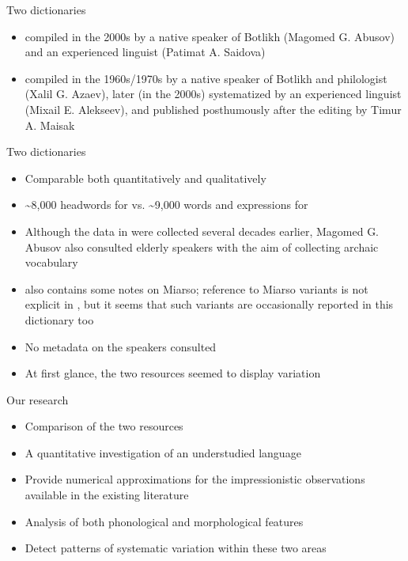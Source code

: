 \begin{frame}{Two dictionaries}
\begin{itemize}
    \item \citet{saidovaabusov2012} compiled in the 2000s by a native speaker of Botlikh (Magomed G. Abusov) and an experienced linguist (Patimat A. Saidova)
    \item \citet{alekseev2019} compiled in the 1960s/1970s by a native speaker of Botlikh and philologist (Xalil G. Azaev), later (in the 2000s) systematized by an experienced linguist (Mixail E. Alekseev), and published posthumously after the editing by Timur A. Maisak
\end{itemize}
\end{frame}

\begin{frame}{Two dictionaries}
\begin{itemize}
    \item Comparable both quantitatively and qualitatively
    \item \textasciitilde{}8,000 headwords for \citet{saidovaabusov2012} vs. \textasciitilde{}9,000 words and expressions for \citet{alekseev2019}
    \item Although the data in \citet{alekseev2019} were collected several decades earlier, Magomed G. Abusov also consulted elderly speakers with the aim of collecting archaic vocabulary 
    \item \citet{saidovaabusov2012} also contains some notes on Miarso; reference to Miarso variants is not explicit in \citet{alekseev2019}, but it seems that such variants are occasionally reported in this dictionary too
    \item No metadata on the speakers consulted
    \item At first glance, the two resources seemed to display variation
\end{itemize}
\end{frame}

\begin{frame}{Our research}
\begin{itemize}
    \item Comparison of the two resources
    \item A quantitative investigation of an understudied language
    \item Provide numerical approximations for the impressionistic observations available in the existing literature
    \item Analysis of both phonological and morphological features 
    \item Detect patterns of systematic variation within these two areas
\end{itemize}
\end{frame}

